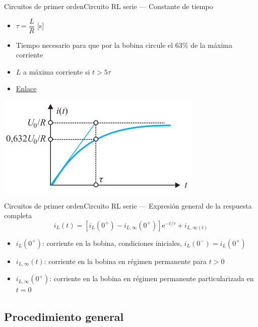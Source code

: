 \documentclass[aspectratio=169, xcolor={usenames,svgnames,dvipsnames}]{beamer}
\begin{document}
\begin{frame}{Circuitos de primer orden}{Circuito RL serie --- Constante de tiempo}
\begin{itemize}
\item \(\tau = \dfrac{L}{R}\) [s]
\item Tiempo necesario para que por la bobina circule el 63\% de la máxima corriente
\item $L$ a máxima corriente si $t>5\tau$
\item \href{https://es.khanacademy.org/science/electrical-engineering/ee-circuit-analysis-topic/ee-natural-and-forced-response/a/ee-rl-natural-response}{Enlace}
\end{itemize}
\begin{center}
\includegraphics[height=0.45\textheight]{../figs/RespuestaCompleta_RL.pdf}
\end{center}
\end{frame}


\begin{frame}{Circuitos de primer orden}{Circuito RL serie --- Expresión general de la respuesta completa}
\[
\boxed{i_L(t) = \left[i_L(0^+) - i_{L,\infty}(0^+)\right] \mathrm{e}^{-t/\tau} + i_{L,\infty(t)}}
\]

\begin{itemize}
\item \(i_L(0^+)\): corriente en la bobina, condiciones iniciales, \(i_L(0^-) = i_L(0^+)\)
\item \(i_{L,\infty}(t)\): corriente en la bobina en régimen permanente para \(t > 0\)
\item \(i_{L,\infty}(0^+)\): corriente en la bobina en régimen permanente particularizada en \(t = 0\)
\end{itemize}
\end{frame}

\subsection{Procedimiento general}
\end{document}
